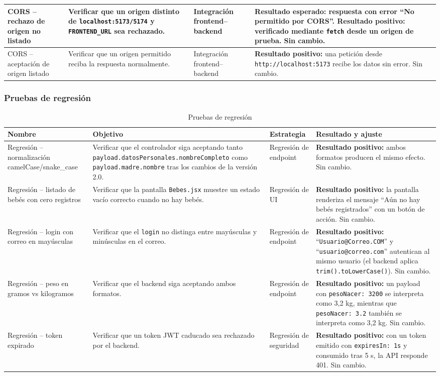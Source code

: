\documentclass[12pt,letterpaper]{article}
\begin{document}
\begin{longtable}{p{}p{}p{}p{}}
CORS -- rechazo de origen no listado & Verificar que un origen distinto de \texttt{localhost:5173/5174} y \texttt{FRONTEND\_URL} sea rechazado. & Integración frontend--backend & \textbf{Resultado esperado:} respuesta con error ``No permitido por CORS''. \textbf{Resultado positivo:} verificado mediante \texttt{fetch} desde un origen de prueba. Sin cambio.\\\hline
CORS -- aceptación de origen listado & Verificar que un origen permitido reciba la respuesta normalmente. & Integración frontend--backend & \textbf{Resultado positivo:} una petición desde \texttt{http://localhost:5173} recibe los datos sin error. Sin cambio.\\\bottomrule
\end{longtable}

\subsubsection{Pruebas de regresión}

\begin{longtable}{p{}p{}p{}p{}}
\caption{Pruebas de regresión}\\\toprule
\textbf{Nombre} & \textbf{Objetivo} & \textbf{Estrategia} & \textbf{Resultado y ajuste} \\\midrule
\endhead
Regresión -- normalización camelCase/snake\_case & Verificar que el controlador siga aceptando tanto \texttt{payload.datosPersonales.nombreCompleto} como \texttt{payload.madre.nombre} tras los cambios de la versión 2.0. & Regresión de endpoint & \textbf{Resultado positivo:} ambos formatos producen el mismo efecto. Sin cambio.\\\hline
Regresión -- listado de bebés con cero registros & Verificar que la pantalla \texttt{Bebes.jsx} muestre un estado vacío correcto cuando no hay bebés. & Regresión de UI & \textbf{Resultado positivo:} la pantalla renderiza el mensaje ``Aún no hay bebés registrados'' con un botón de acción. Sin cambio.\\\hline
Regresión -- login con correo en mayúsculas & Verificar que el \texttt{login} no distinga entre mayúsculas y minúsculas en el correo. & Regresión de endpoint & \textbf{Resultado positivo:} ``\texttt{Usuario@Correo.COM}'' y ``\texttt{usuario@correo.com}'' autentican al mismo usuario (el backend aplica \texttt{trim().toLowerCase()}). Sin cambio.\\\hline
Regresión -- peso en gramos vs kilogramos & Verificar que el backend siga aceptando ambos formatos. & Regresión de endpoint & \textbf{Resultado positivo:} un payload con \texttt{pesoNacer: 3200} se interpreta como 3,2 kg, mientras que \texttt{pesoNacer: 3.2} también se interpreta como 3,2 kg. Sin cambio.\\\hline
Regresión -- token expirado & Verificar que un token JWT caducado sea rechazado por el backend. & Regresión de seguridad & \textbf{Resultado positivo:} con un token emitido con \texttt{expiresIn: 1s} y consumido tras 5 s, la API responde 401. Sin cambio.\\\bottomrule
\end{longtable}
\end{document}
